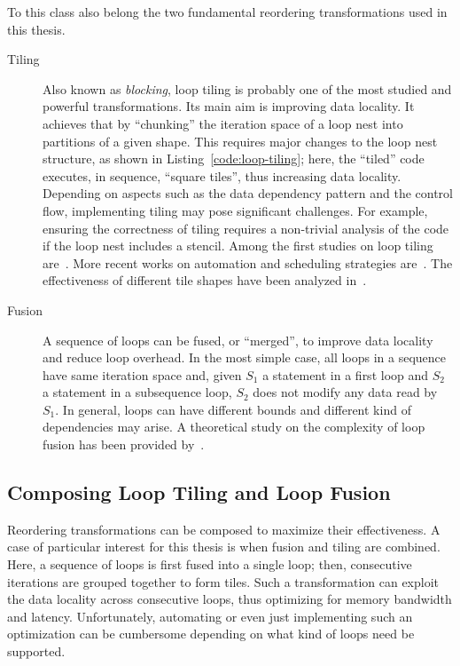 To this class also belong the two fundamental reordering transformations used in this thesis.
\begin{description}
\item[Tiling] Also known as {\em blocking}, loop tiling is probably one of the most studied and powerful transformations. Its main aim is improving data locality. It achieves that by ``chunking'' the iteration space of a loop nest into partitions of a given shape. This requires major changes to the loop nest structure, as shown in Listing~\ref{code:loop-tiling}; here, the ``tiled'' code executes, in sequence, ``square tiles'', thus increasing data locality. Depending on aspects such as the data dependency pattern and the control flow, implementing tiling may pose significant challenges. For example, ensuring the correctness of tiling requires a non-trivial analysis of the code if the loop nest includes a stencil. Among the first studies on loop tiling are~\cite{early-tile-cite-1,early-tile-cite-2}. More recent works on automation and scheduling strategies are~\cite{recent-tile-cite-1,recent-tile-cite-2,recent-tile-cite-3}. The effectiveness of different tile shapes have been analyzed in~\cite{tile-shape-1,tile-shape-2}. 
\item[Fusion] A sequence of loops can be fused, or ``merged'', to improve data locality and reduce loop overhead. In the most simple case, all loops in a sequence have same iteration space and, given $S_1$ a statement in a first loop and $S_2$ a statement in a subsequence loop, $S_2$ does not modify any data read by $S_1$. In general, loops can have different bounds and different kind of dependencies may arise. A theoretical study on the complexity of loop fusion has been provided by~\cite{fusion-complexity}. 
\end{description}

\subsection{Composing Loop Tiling and Loop Fusion}
\label{sec:bkg:tiling}
Reordering transformations can be composed to maximize their effectiveness. A case of particular interest for this thesis is when fusion and tiling are combined. Here, a sequence of loops is first fused into a single loop; then, consecutive iterations are grouped together to form tiles. Such a transformation can exploit the data locality across consecutive loops, thus optimizing for memory bandwidth and latency. Unfortunately, automating or even just implementing such an optimization can be cumbersome depending on what kind of loops need be supported. 

